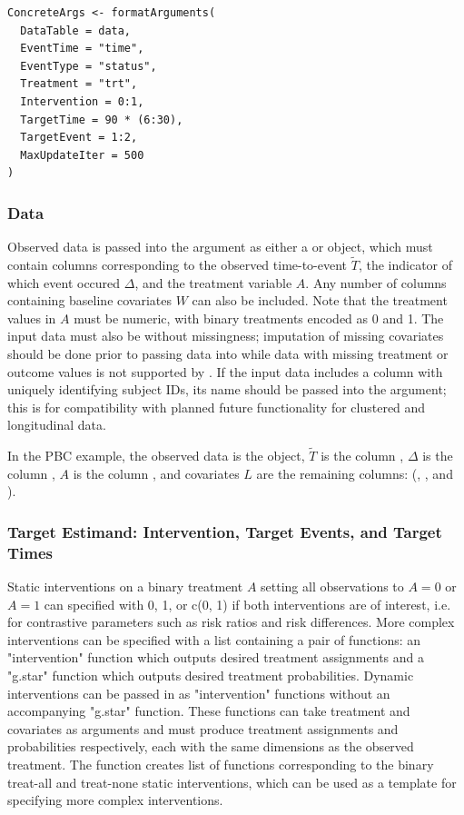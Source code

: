 \documentclass{report}
\newcommand{\1}{\ensuremath{\mathbf{1}}}
\newcommand{\T}{\ensuremath{\widetilde{T}}}
\renewcommand{\L}{\ensuremath{W}}
\begin{document}
\begin{lstlisting}
ConcreteArgs <- formatArguments(
  DataTable = data,
  EventTime = "time",
  EventType = "status",
  Treatment = "trt",
  Intervention = 0:1,
  TargetTime = 90 * (6:30),
  TargetEvent = 1:2,
  MaxUpdateIter = 500
)
\end{lstlisting}

\subsubsection{Data}
\label{ObservedDataConcrete}
Observed data is passed into the  argument as either a  or  object, which must contain columns corresponding to the observed time-to-event \(\T\), the indicator of which event occured \(\Delta\), and the treatment variable \(A\). Any number of columns containing baseline covariates \(\L\) can also be included. Note that the treatment values in \(A\) must be numeric, with binary treatments encoded as 0 and 1. The input data must also be without missingness; imputation of missing covariates should be done prior to passing data into  while data with missing treatment or outcome values is not supported by . If the input data includes a column with uniquely identifying subject IDs, its name should be passed into the  argument; this is for compatibility with planned future functionality for clustered and longitudinal data.

In the PBC example, the observed data is the  object, \(\T\) is the column , \(\Delta\) is the column , \(A\) is the column , and covariates \(L\) are the remaining columns: (, , and ).

\subsubsection{Target Estimand: Intervention, Target Events, and Target Times}
\label{Estimand}
Static interventions on a binary treatment \(A\) setting all observations to \(A=0\) or \(A=1\) can specified with 0, 1, or c(0, 1) if both interventions are of interest, i.e. for contrastive parameters such as risk ratios and risk differences. More complex interventions can be specified with a list containing a pair of functions: an "intervention" function which outputs desired treatment assignments and a "g.star" function which outputs desired treatment probabilities. Dynamic interventions can be passed in as "intervention" functions without an accompanying "g.star" function. These functions can take treatment and covariates as arguments and must produce treatment assignments and probabilities respectively, each with the same dimensions as the observed treatment. The function  creates list of functions corresponding to the binary treat-all and treat-none static interventions, which can be used as a template for specifying more complex interventions.
\end{document}
